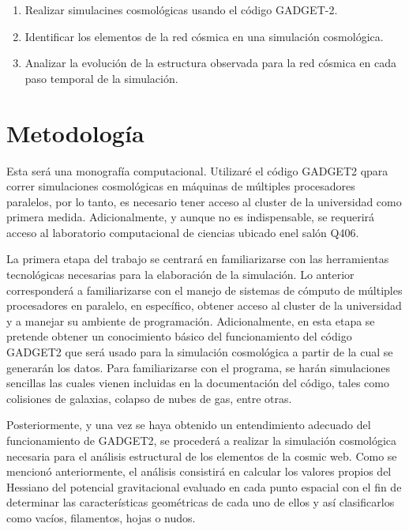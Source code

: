 \documentclass{article}
\begin{document}
\begin{enumerate}


\item Realizar simulacines cosmológicas usando el código GADGET-2.
\item Identificar los elementos de la red c\'osmica en una simulaci\'on
  cosmol\'ogica.
\item Analizar la evolución de la estructura observada para la red
  c\'osmica en cada paso temporal de la simulaci\'on. 
\end{enumerate}


\section{Metodología}


Esta será una monografía computacional. Utilizar\'e el código
GADGET2 qpara correr simulaciones cosmológicas en máquinas de
múltiples procesadores paralelos, por lo tanto, es necesario tener
acceso al cluster de la universidad como primera
medida. Adicionalmente, y aunque no es indispensable, se requerirá
acceso al laboratorio computacional de ciencias ubicado enel salón
Q406.  
  
La primera etapa del trabajo se centrará en familiarizarse con las
herramientas tecnológicas necesarias para la elaboración de la
simulación. Lo anterior corresponderá a familiarizarse con el manejo
de sistemas de cómputo de múltiples procesadores en paralelo, en
específico, obtener acceso al cluster de la universidad y a manejar su
ambiente de programación. Adicionalmente, en esta etapa se pretende
obtener un conocimiento básico del funcionamiento del código GADGET2
que será usado para la simulación cosmológica a partir de la cual se
generarán los datos. Para familiarizarse con el programa, se harán
simulaciones sencillas las cuales vienen incluidas en la documentación
del código, tales como colisiones de galaxias, colapso de nubes de
gas, entre otras.  

Posteriormente, y una vez se haya obtenido un entendimiento adecuado
del funcionamiento de GADGET2, se procederá a realizar la simulación
cosmológica necesaria para el análisis estructural de los elementos de
la cosmic web. Como se mencionó anteriormente, el análisis consistirá
en calcular los valores propios del Hessiano del potencial
gravitacional evaluado en cada punto espacial con el fin de determinar
las características geométricas de cada uno de ellos y así
clasificarlos como vacíos, filamentos, hojas o nudos. 
\end{document}
